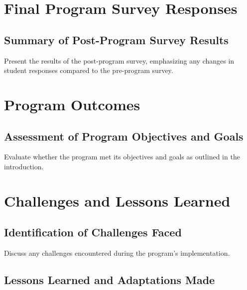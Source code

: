 \documentclass[
]{article}
\begin{document}
\hypertarget{final-program-survey-responses}{%
\section{Final Program Survey
Responses}\label{final-program-survey-responses}}

\hypertarget{summary-of-post-program-survey-results}{%
\subsection{Summary of Post-Program Survey
Results}\label{summary-of-post-program-survey-results}}

Present the results of the post-program survey, emphasizing any changes
in student responses compared to the pre-program survey.

\hypertarget{program-outcomes}{%
\section{Program Outcomes}\label{program-outcomes}}

\hypertarget{assessment-of-program-objectives-and-goals}{%
\subsection{Assessment of Program Objectives and
Goals}\label{assessment-of-program-objectives-and-goals}}

Evaluate whether the program met its objectives and goals as outlined in
the introduction.

\hypertarget{challenges-and-lessons-learned}{%
\section{Challenges and Lessons
Learned}\label{challenges-and-lessons-learned}}

\hypertarget{identification-of-challenges-faced}{%
\subsection{Identification of Challenges
Faced}\label{identification-of-challenges-faced}}

Discuss any challenges encountered during the program's implementation.

\hypertarget{lessons-learned-and-adaptations-made}{%
\subsection{Lessons Learned and Adaptations
Made}\label{lessons-learned-and-adaptations-made}}
\end{document}
